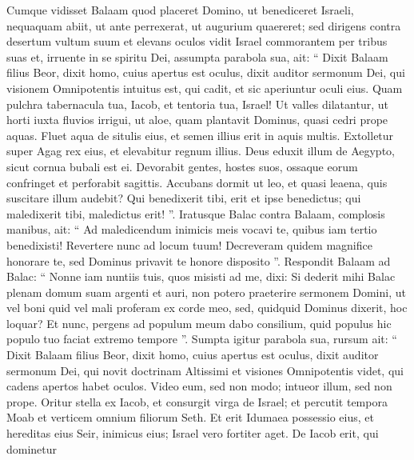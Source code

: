 \begin{biblechapter}
\begin{biblechapter}
\begin{biblechapter}
\begin{biblechapter}
\begin{biblechapter}
\begin{biblechapter}
\begin{biblechapter}
\begin{biblechapter}
\begin{biblechapter}
\begin{biblechapter}
\begin{biblechapter}
\begin{biblechapter}
\begin{biblechapter}
\begin{biblechapter}
\begin{biblechapter}
\begin{biblechapter}
\begin{biblechapter}
\begin{biblechapter}
\begin{biblechapter}
\begin{biblechapter}
\begin{biblechapter}
\begin{biblechapter}
\begin{biblechapter}
\begin{biblechapter}
\verse Cumque vidisset Balaam quod placeret Domino, ut benediceret Israeli, nequaquam abiit, ut ante perrexerat, ut augurium quaereret; sed dirigens contra desertum vultum suum 
\verse et elevans oculos vidit Israel commorantem per tribus suas et, irruente in se spiritu Dei, 
\verse assumpta parabola sua, ait:
 “ Dixit Balaam filius Beor,
 dixit homo, cuius apertus est oculus,
 \verse dixit auditor sermonum Dei,
 qui visionem Omnipotentis intuitus est,
 qui cadit, et sic aperiuntur oculi eius.
 \verse Quam pulchra tabernacula tua, Iacob,
 et tentoria tua, Israel!
 \verse Ut valles dilatantur,
 ut horti iuxta fluvios irrigui,
 ut aloe, quam plantavit Dominus,
 quasi cedri prope aquas.
 \verse Fluet aqua de situlis eius,
 et semen illius erit in aquis multis. Extolletur super Agag rex eius,
 et elevabitur regnum illius.
 \verse Deus eduxit illum de Aegypto,
 sicut cornua bubali est ei.
 Devorabit gentes, hostes suos,
 ossaque eorum confringet
 et perforabit sagittis.
 \verse Accubans dormit ut leo,
 et quasi leaena, quis suscitare illum audebit?
 Qui benedixerit tibi, erit et ipse benedictus;
 qui maledixerit tibi, maledictus erit! ”.
 \verse Iratusque Balac contra Balaam, complosis manibus, ait: “ Ad maledicendum inimicis meis vocavi te, quibus iam tertio benedixisti! 
\verse Revertere nunc ad locum tuum! Decreveram quidem magnifice honorare te, sed Dominus privavit te honore disposito ”. 
\verse Respondit Balaam ad Balac: “ Nonne iam nuntiis tuis, quos misisti ad me, dixi: 
\verse Si dederit mihi Balac plenam domum suam argenti et auri, non potero praeterire sermonem Domini, ut vel boni quid vel mali proferam ex corde meo, sed, quidquid Dominus dixerit, hoc loquar? 
\verse Et nunc, pergens ad populum meum dabo consilium, quid populus hic populo tuo faciat extremo tempore ”. 
\verse Sumpta igitur parabola sua, rursum ait:
 “ Dixit Balaam filius Beor,
 dixit homo, cuius apertus est oculus, 
\verse dixit auditor sermonum Dei,
 qui novit doctrinam Altissimi
 et visiones Omnipotentis videt,
 qui cadens apertos habet oculos.
 \verse Video eum, sed non modo;
 intueor illum, sed non prope.
 Oritur stella ex Iacob,
 et consurgit virga de Israel;
 et percutit tempora Moab
 et verticem omnium filiorum Seth. 
\verse Et erit Idumaea possessio eius,
 et hereditas eius Seir, inimicus eius; Israel vero fortiter aget.
 \verse De Iacob erit, qui dominetur

\end{biblechapter}
\end{biblechapter}
\end{biblechapter}
\end{biblechapter}
\end{biblechapter}
\end{biblechapter}
\end{biblechapter}
\end{biblechapter}
\end{biblechapter}
\end{biblechapter}
\end{biblechapter}
\end{biblechapter}
\end{biblechapter}
\end{biblechapter}
\end{biblechapter}
\end{biblechapter}
\end{biblechapter}
\end{biblechapter}
\end{biblechapter}
\end{biblechapter}
\end{biblechapter}
\end{biblechapter}
\end{biblechapter}
\end{biblechapter}
